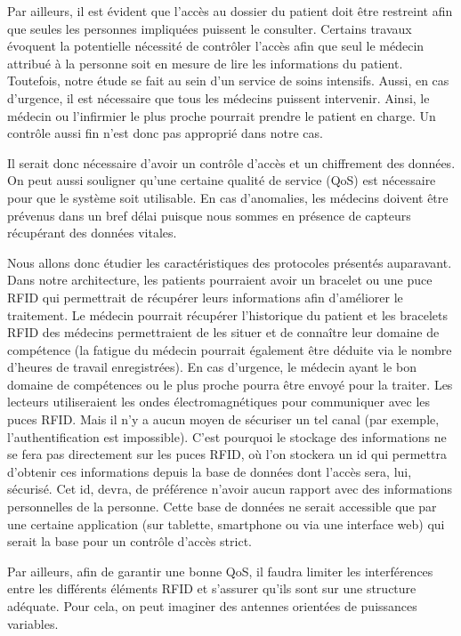 \documentclass{article}
\begin{document}
Par ailleurs, il est évident que l’accès au dossier du patient doit être restreint afin que seules les personnes impliquées puissent le consulter. Certains travaux évoquent la potentielle nécessité de contrôler l’accès afin que seul le médecin attribué à la personne soit en mesure de lire les informations du patient. Toutefois, notre étude se fait au sein d’un service de soins intensifs. Aussi, en cas d’urgence, il est nécessaire que tous les médecins puissent intervenir. Ainsi, le médecin ou l'infirmier le plus proche pourrait prendre le patient en charge. Un contrôle aussi fin n’est donc pas approprié dans notre cas.

Il serait donc nécessaire d’avoir un contrôle d’accès et un chiffrement des données. On peut aussi souligner qu’une certaine qualité de service (QoS) est nécessaire pour que le système soit utilisable. En cas d’anomalies, les médecins doivent être prévenus dans un bref délai puisque nous sommes en présence de capteurs récupérant des données vitales. 

Nous allons donc étudier les caractéristiques des protocoles présentés auparavant.
\\

Dans notre architecture, les patients pourraient avoir un bracelet ou une puce RFID qui permettrait de récupérer leurs informations afin d’améliorer le traitement. Le médecin pourrait récupérer l’historique du patient et les bracelets RFID des médecins permettraient de les situer et de connaître leur domaine de compétence (la fatigue du médecin pourrait également être déduite via le nombre d’heures de travail enregistrées). En cas d’urgence, le médecin ayant le bon domaine de compétences ou le plus proche pourra être envoyé pour la traiter. Les lecteurs utiliseraient les ondes électromagnétiques pour communiquer avec les puces RFID. Mais il n’y a aucun moyen de sécuriser un tel canal (par exemple, l’authentification est impossible). C'est pourquoi le stockage des informations ne se fera pas directement sur les puces RFID, où l'on stockera un id qui permettra d’obtenir ces informations depuis la base de données dont l'accès sera, lui, sécurisé. Cet id, devra, de préférence n’avoir aucun rapport avec des informations personnelles de la personne. Cette base de données ne serait accessible que par une certaine application (sur tablette, smartphone ou via une interface web) qui serait la base pour un contrôle d’accès strict.

Par ailleurs, afin de garantir une bonne QoS, il faudra limiter les interférences entre les différents éléments RFID et s’assurer qu’ils sont sur une structure adéquate. Pour cela, on peut imaginer des antennes orientées de puissances variables. 
\\
\end{document}
